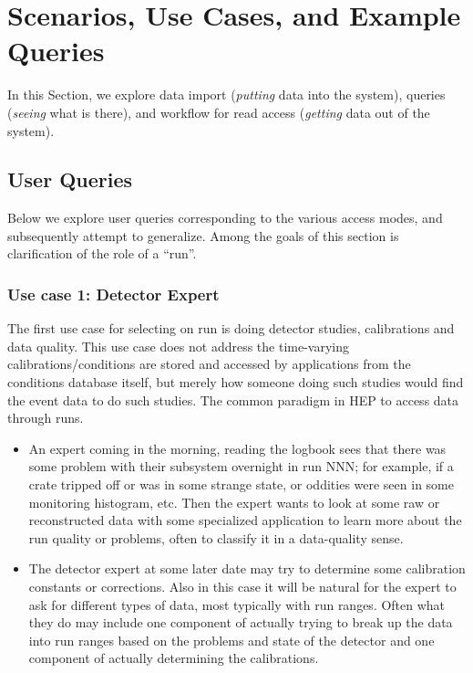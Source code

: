 \documentclass{cmspaper}
\begin{document}
\section{Scenarios, Use Cases, and Example Queries}

In this Section, we explore data import
({\em putting} data into the system), queries ({\em seeing} what is there),
and workflow for read access ({\em getting} data out of the system).

\subsection{User Queries}

Below we explore user queries corresponding to the various access modes,
and subsequently attempt to generalize. Among the goals of this section
is clarification of the role of a ``run''.

\subsubsection{Use case 1: Detector Expert}

  The first use case for selecting on run is doing detector studies,
calibrations and data quality. This use case does not address the
time-varying calibrations/conditions are stored and accessed by
applications from the conditions database itself, but merely how someone
doing such studies would find the event data to do such studies. The
common paradigm in HEP to access data through runs.

\begin{itemize}

\item An expert coming in the morning, reading the logbook sees that there was
     some problem with their subsystem overnight in run NNN; for example,
     if a crate tripped off or was in some strange state, or oddities
     were seen in some monitoring histogram, etc. Then the expert wants
     to look at some raw or reconstructed data with some specialized
     application to learn more about the run quality or problems, often
     to classify it in a data-quality sense.

\item The detector expert at some later date may try to determine
     some calibration constants or corrections. Also in this case it
     will be natural for the expert to ask for different types of data,
     most typically with run ranges. Often what they do may include one
     component of actually trying to break up the data into run ranges
     based on the problems and state of the detector and one component
     of actually determining the calibrations.

\end{itemize}
\end{document}

